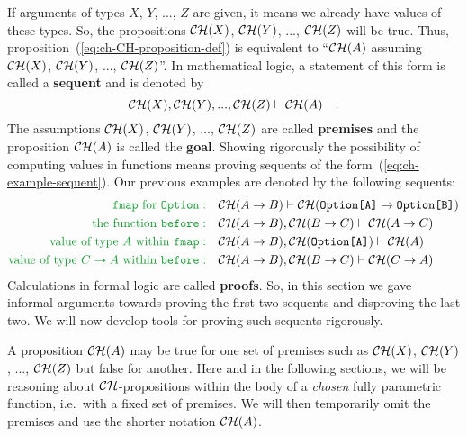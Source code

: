 If arguments of types $X$, $Y$, ..., $Z$ are given, it means we
already have values of these types. So, the propositions ${\cal CH}(X)$,
${\cal CH}(Y)$, ..., ${\cal CH}(Z)$ will be true. Thus, proposition~(\ref{eq:ch-CH-proposition-def})
is equivalent to ``${\cal CH}(A)$ assuming ${\cal CH}(X)$, ${\cal CH}(Y)$,
..., ${\cal CH}(Z)$''. In mathematical logic, a statement of this
form is called a \textbf{sequent} and is denoted
by
\begin{equation}
{\cal CH}(X),{\cal CH}(Y),...,{\cal CH}(Z)\vdash{\cal CH}(A)\quad.\label{eq:ch-example-sequent}
\end{equation}
The assumptions ${\cal CH}(X)$, ${\cal CH}(Y)$, ..., ${\cal CH}(Z)$
are called \textbf{premises} and the proposition
${\cal CH}(A)$ is called the \textbf{goal}.
Showing rigorously the possibility of computing values in functions
means proving sequents of the form~(\ref{eq:ch-example-sequent}).
Our previous examples are denoted by the following sequents:
\begin{align*}
{\color{greenunder}\text{\texttt{fmap} for \texttt{Option}}:}\quad & {\cal CH}(A\rightarrow B)\vdash{\cal CH}(\text{\texttt{Option[A]}}\rightarrow\text{\texttt{Option[B]}})\\
{\color{greenunder}\text{the function \texttt{before}}:}\quad & {\cal CH}(A\rightarrow B),{\cal CH}(B\rightarrow C)\vdash{\cal CH}(A\rightarrow C)\\
{\color{greenunder}\text{value of type }A\text{ within \texttt{fmap}}:}\quad & {\cal CH}(A\rightarrow B),{\cal CH}(\text{\texttt{Option[A]}})\vdash{\cal CH}(A)\\
{\color{greenunder}\text{value of type }C\rightarrow A\text{ within \texttt{before}}:}\quad & {\cal CH}(A\rightarrow B),{\cal CH}(B\rightarrow C)\vdash{\cal CH}(C\rightarrow A)
\end{align*}
Calculations in formal logic are called \textbf{proofs}.
So, in this section we gave informal arguments towards proving the
first two sequents and disproving the last two. We will now develop
tools for proving such sequents rigorously.

A proposition ${\cal CH}(A)$ may be true for one set of premises
such as ${\cal CH}(X)$, ${\cal CH}(Y)$, ..., ${\cal CH}(Z)$ but
false for another. Here and in the following sections, we will be
reasoning about ${\cal CH}$-propositions within the body of a \emph{chosen}
fully parametric function, i.e.~with a fixed set of premises. We
will then temporarily omit the premises and use the shorter notation
${\cal CH}(A)$.

